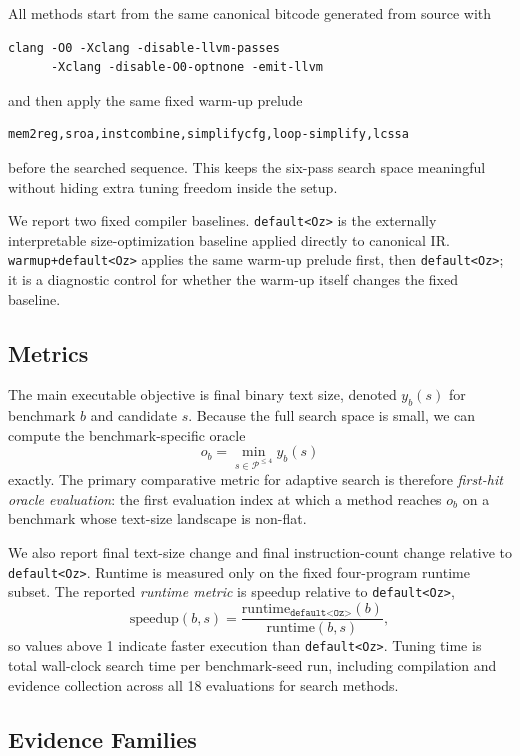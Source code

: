 \documentclass{article}
\begin{document}
All methods start from the same canonical bitcode generated from source with
\begin{verbatim}
clang -O0 -Xclang -disable-llvm-passes
      -Xclang -disable-O0-optnone -emit-llvm
\end{verbatim}
and then apply the same fixed warm-up prelude
\begin{verbatim}
mem2reg,sroa,instcombine,simplifycfg,loop-simplify,lcssa
\end{verbatim}
before the searched sequence. This keeps the six-pass search space meaningful without hiding extra tuning freedom inside the setup.

We report two fixed compiler baselines. \texttt{default<Oz>} is the externally interpretable size-optimization baseline applied directly to canonical IR. \texttt{warmup+default<Oz>} applies the same warm-up prelude first, then \texttt{default<Oz>}; it is a diagnostic control for whether the warm-up itself changes the fixed baseline.

\subsection{Metrics}

The main executable objective is final binary text size, denoted $y_b(s)$ for benchmark $b$ and candidate $s$. Because the full search space is small, we can compute the benchmark-specific oracle
\[
o_b = \min_{s \in \mathcal{P}^{\le 4}} y_b(s)
\]
exactly. The primary comparative metric for adaptive search is therefore \emph{first-hit oracle evaluation}: the first evaluation index at which a method reaches $o_b$ on a benchmark whose text-size landscape is non-flat.

We also report final text-size change and final instruction-count change relative to \texttt{default<Oz>}. Runtime is measured only on the fixed four-program runtime subset. The reported \emph{runtime metric} is speedup relative to \texttt{default<Oz>},
\[
\text{speedup}(b,s)=
\frac{\text{runtime}_{\texttt{default<Oz>}}(b)}
     {\text{runtime}(b,s)},
\]
so values above 1 indicate faster execution than \texttt{default<Oz>}. Tuning time is total wall-clock search time per benchmark-seed run, including compilation and evidence collection across all 18 evaluations for search methods.

\subsection{Evidence Families}
\end{document}
